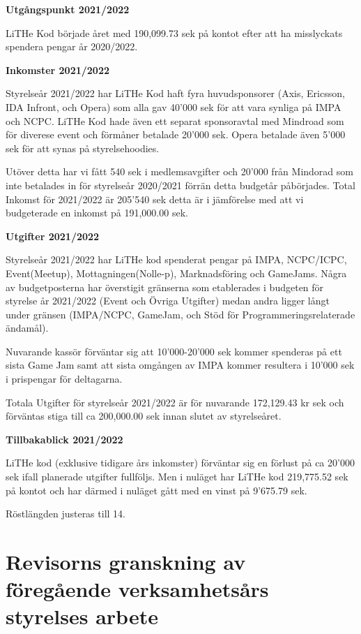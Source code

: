 \documentclass[a4paper]{article}
\newenvironment{quotationb}%
{\begin{leftbar}}%
{\end{leftbar}}
\begin{document}
\begin{quotationb}

\textbf{Utgångspunkt 2021/2022}

LiTHe Kod började året med 190,099.73 sek på kontot efter att ha
misslyckats spendera pengar år 2020/2022.

\textbf{Inkomster 2021/2022}

Styrelseår 2021/2022 har LiTHe Kod haft fyra huvudsponsorer (Axis,
Ericsson, IDA Infront, och Opera) som alla gav 40'000 sek för att vara
synliga på IMPA och NCPC. LiTHe Kod hade även ett separat sponsoravtal
med Mindroad som för diverese event och förmåner betalade 20'000
sek. Opera betalade även 5'000 sek för att synas på styrelsehoodies.

Utöver detta har vi fått 540 sek i medlemsavgifter och 20'000 från
Mindorad som inte betalades in för styrelseår 2020/2021 förrän detta
budgetår påbörjades. Total Inkomst för 2021/2022 är 205'540 sek detta
är i jämförelse med att vi budgeterade en inkomst på 191,000.00 sek.

\textbf{Utgifter 2021/2022}

Styrelseår 2021/2022 har LiTHe kod spenderat pengar på IMPA,
NCPC/ICPC, Event(Meetup), Mottagningen(Nolle-p), Marknadsföring och
GameJams. Några av budgetposterna har överstigit gränserna som
etablerades i budgeten för styrelse år 2021/2022 (Event och Övriga
Utgifter) medan andra ligger långt under gränsen (IMPA/NCPC, GameJam,
och Stöd för Programmeringsrelaterade ändamål).

 Nuvarande kassör förväntar sig att 10'000-20'000 sek kommer spenderas
på ett sista Game Jam samt att sista omgången av IMPA kommer resultera
i 10'000 sek i prispengar för deltagarna.

Totala Utgifter för styrelseår 2021/2022 är för nuvarande 172,129.43
kr sek och förväntas stiga till ca 200,000.00 sek innan slutet av
styrelseåret.

\textbf{Tillbakablick 2021/2022}

LiTHe kod (exklusive tidigare års inkomster) förväntar sig en förlust
på ca 20'000 sek ifall planerade utgifter fullföljs. Men i nuläget
har LiTHe kod 219,775.52 sek på kontot och har därmed i nuläget gått
med en vinst på 9'675.79 sek.

\end{quotationb}

Röstlängden justeras till 14.

\section{Revisorns granskning av föregående verksamhetsårs styrelses arbete}
\end{document}

